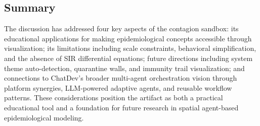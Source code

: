 \subsection{Summary}

The discussion has addressed four key aspects of the contagion sandbox: its educational applications for making epidemiological concepts accessible through visualization; its limitations including scale constraints, behavioral simplification, and the absence of SIR differential equations; future directions including system theme auto-detection, quarantine walls, and immunity trail visualization; and connections to ChatDev's broader multi-agent orchestration vision through platform synergies, LLM-powered adaptive agents, and reusable workflow patterns. These considerations position the artifact as both a practical educational tool and a foundation for future research in spatial agent-based epidemiological modeling.
